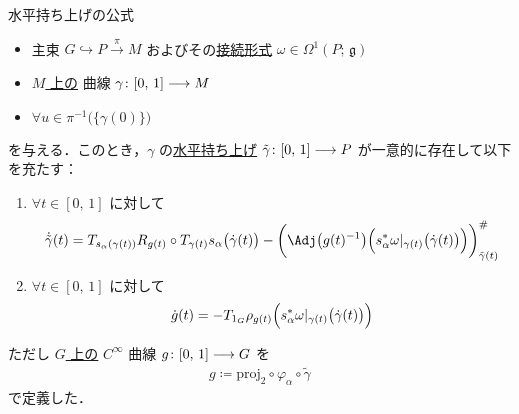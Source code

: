 \documentclass[TQFT_main]{subfiles}
\begin{document}
\begin{mylem}[label=lem:horizontal-lift-curve]{水平持ち上げの公式}
    \begin{itemize}
        \item 主束 $G \hookrightarrow P \xrightarrow{\pi} M$ およびその\hyperref[def:connection]{接続形式} $\omega \in \Omega^1(P;\, \mathfrak{g})$
        \item \underline{$M$ 上の} \cinfty 曲線 $\gamma \colon [0,\, 1] \longrightarrow M$
        \item $\forall u \in \pi^{-1} \bigl( \{\gamma(0)\} \bigr)$
    \end{itemize}
    を与える．このとき，$\gamma$ の\hyperref[def:horizontal-lift-curve]{水平持ち上げ} $\tilde{\gamma} \colon [0,\, 1] \longrightarrow P$ が一意的に存在して以下を充たす：
    \begin{enumerate}
        \item $\forall t \in [0,\, 1]$ に対して
        \begin{align}
            \dot{\tilde{\gamma}} (t) = T_{s_\alpha(\gamma(t))} R_{g(t)} \circ T_{\gamma(t)}s_\alpha \bigl(\dot{\gamma}(t)\bigr) - \biggl(\Adj \bigl( g(t)^{-1} \bigr) \Bigl( s_\alpha^* \omega|_{\gamma(t)}\bigl(\dot{\gamma}(t)\bigr) \Bigr) \biggr)^\#_{\tilde{\gamma}(t)}
        \end{align}
        \item $\forall t \in [0,\, 1]$ に対して
        \begin{align}
            \dot{g}(t) = -T_{1_G} \rho_{g(t)} \Bigl(s_\alpha^* \omega|_{\gamma(t)} \bigl( \dot{\gamma}(t) \bigr)  \Bigr)
        \end{align}
    \end{enumerate}
    ただし \underline{$G$ 上の} $C^\infty$ 曲線 $g \colon [0,\, 1] \longrightarrow G$ を 
    \begin{align}
        g \coloneqq \mathrm{proj}_2 \circ \varphi_\alpha \circ \tilde{\gamma}
    \end{align}
    で定義した．
\end{mylem}
\end{document}
